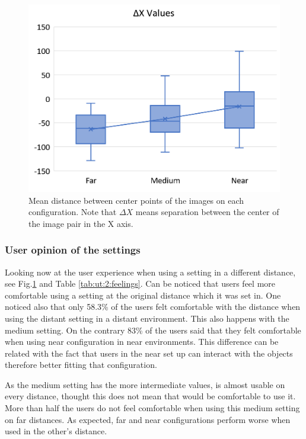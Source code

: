 \documentclass[10pt,a4paper,twocolumn,twoside]{article}
\begin{document}
	\begin{figure}
		\centering
		\includegraphics[width=1\linewidth]{img/fancydelta.png}
		\caption{Mean distance between center points of the images on each configuration. Note that $\Delta X$ means separation between the center of the image pair in the X axis.}
		\label{fig:ut:2:deltax}
	\end{figure}
	
	\subsubsection{User opinion of the settings }
	Looking now at the user experience when using a setting in a different distance, see Fig.\ref{fig:ut:2:deltax} and Table \ref{tab:ut:2:feelings}. Can be noticed that users feel more comfortable using a setting at the original distance which it was set in. One noticed also that only 58.3\% of the users felt comfortable with the distance when using the distant setting in a distant environment. This also happens with the medium setting. On the contrary 83\% of the users said that they felt comfortable when using near configuration in near environments. This difference can be related with the fact that users in the near set up can interact with the objects therefore better fitting that configuration. 
	
	As the medium setting has the more intermediate values, is almost usable on every distance, thought this does not mean that would be comfortable to use it. More than half the users do not feel comfortable when using this medium setting on far distances. As expected, far and near configurations perform worse when used in the other's distance.
	
\end{document}
